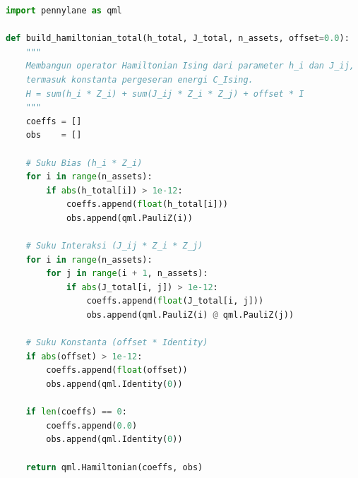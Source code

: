 \begin{lstlisting}[language=Python, caption={Skrip perakitan operator Hamiltonian Ising dinamis menggunakan pustaka \texttt{PennyLane}}, label={lst:build_hamiltonian}]
import pennylane as qml

def build_hamiltonian_total(h_total, J_total, n_assets, offset=0.0):
    """
    Membangun operator Hamiltonian Ising dari parameter h_i dan J_ij,
    termasuk konstanta pergeseran energi C_Ising.
    H = sum(h_i * Z_i) + sum(J_ij * Z_i * Z_j) + offset * I
    """
    coeffs = []
    obs    = []

    # Suku Bias (h_i * Z_i)
    for i in range(n_assets):
        if abs(h_total[i]) > 1e-12:
            coeffs.append(float(h_total[i]))
            obs.append(qml.PauliZ(i))

    # Suku Interaksi (J_ij * Z_i * Z_j)
    for i in range(n_assets):
        for j in range(i + 1, n_assets):
            if abs(J_total[i, j]) > 1e-12:
                coeffs.append(float(J_total[i, j]))
                obs.append(qml.PauliZ(i) @ qml.PauliZ(j))

    # Suku Konstanta (offset * Identity)
    if abs(offset) > 1e-12:
        coeffs.append(float(offset))
        obs.append(qml.Identity(0))

    if len(coeffs) == 0:
        coeffs.append(0.0)
        obs.append(qml.Identity(0))

    return qml.Hamiltonian(coeffs, obs)
\end{lstlisting}

